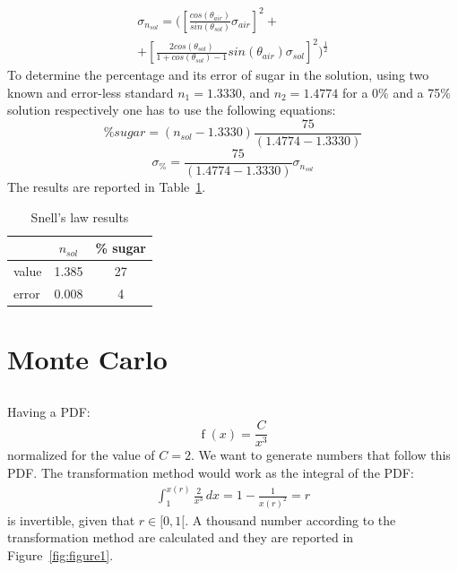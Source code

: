 \documentclass[twocolumn]{article}
\begin{document}
		\begin{multline}
		\sigma_{n_{sol}} = (\left[\frac{cos(\theta_{air})}{sin(\theta_{sol})}  \sigma_{air} \right]^2 + \\
		+ \left[ \frac{2 cos(\theta_{sol})}{1+cos(\theta_{sol})-1}  sin(\theta_{air}) \sigma_{sol}  \right] ^2 )^{\frac{1}{2}}
		\end{multline} 
		To determine the percentage and its error of sugar in the solution, using two known and error-less standard $n_1 = 1.3330$, and $n_2 = 1.4774$ for a  0\% and a 75\% solution respectively one has to use the following equations:
		\begin{equation}
		\% sugar = ( n_{sol} - 1.3330) \frac{75}{ (1.4774- 1.3330)}
		\end{equation}
		\begin{equation}
			\sigma_{\%} = \frac{75}{ (1.4774- 1.3330)} \sigma_{n_{sol}}
		\end{equation}
		The results are reported in Table~\ref{tab:snell}.
		\begin{table}[h!]
			\caption{Snell's law results}
			\label{tab:snell}
			\begin{center}
				\begin{tabular}{l|cc}
				\hline

				\hline
				\textbf{} & \textbf {$n_{sol}$ } & \textbf{ \% sugar} \\
				\hline
					value & 1.385  & 27 \\
					error & 0.008 & 4 \\
				\hline

				\hline
				\end{tabular}
			\end{center}
		\end{table}

\section{Monte Carlo} %
	\label{sec:monte_carlo}
	\subsection{}
	\label{sub:MCnumber}
	 Having a PDF:
	 \begin{equation}
	 \label{eq:mcpdf}
	 	\operatorname{f}{\left (x \right )} = \frac{C}{x^{3}}
	 \end{equation}
	 normalized for the value of $C=2$.
	 We want to generate numbers that follow this PDF. 
	 The transformation method would  work as the integral of the PDF:
	 \begin{multline}
	 	\int_{1}^{x(r)} \frac{2}{x^{3}}\, dx = 1 - \frac{1}{x(r)^{2}} = r
	 \end{multline}
		is  invertible, given that $r \in [0,1[$. 
		A thousand number according to the transformation method are calculated and they are reported in Figure~\ref{fig:figure1}.
\end{document}
